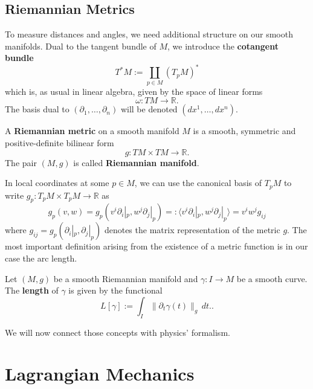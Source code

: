 \subsection*{Riemannian Metrics}
To measure distances and angles, we need additional structure on our smooth manifolds. Dual to the tangent bundle of $M$, we introduce the \textbf{cotangent bundle}
\[
    T^\ast M:= \coprod_{p \in M} (T_pM)^\ast
\] which is, as usual in linear algebra, given by the space of linear forms
\[
\omega: TM \to \mathbb{R}
.\] The basis dual to $(\partial_1, \dots, \partial_n)$ will be denoted $(dx^1, \dots, dx^n)$. 
\begin{definition}
    A \textbf{Riemannian metric} on a smooth manifold $M$ is a smooth, symmetric and positive-definite bilinear form
    \[
    g: TM \times TM \to \mathbb{R}
    .\] The pair $(M,g)$ is called \textbf{Riemannian manifold}.
\end{definition}
In local coordinates at some $p \in M$, we can use the canonical basis of $T_pM$ to write $g_p: T_pM \times T_p M \to \mathbb{R}$ as
\[
    g_p(v,w) = g_p(v^i \partial_i|_p, w^j \partial_j|_p) =: \langle v^i\partial_i|_p, w^j \partial_j|_p \rangle =  v^i w^j g_{ij}
\] where $g_{ij}=g_p(\partial_i|_p, \partial_j|_p)$ denotes the matrix representation of the metric $g$. The most important definition arising from the existence of a metric function is in our case the arc length.
\begin{definition}[Length]
    Let $(M,g)$ be a smooth Riemannian manifold and $\gamma: I \to M$ be a smooth curve. The \textbf{length} of $\gamma$ is given by the functional
    \[
        L[\gamma]:= \int_I \| \partial_t \gamma(t)\|_g \, dt.
    .\] 
\end{definition}
We will now connect those concepts with physics' formalism.
\section{Lagrangian Mechanics}

